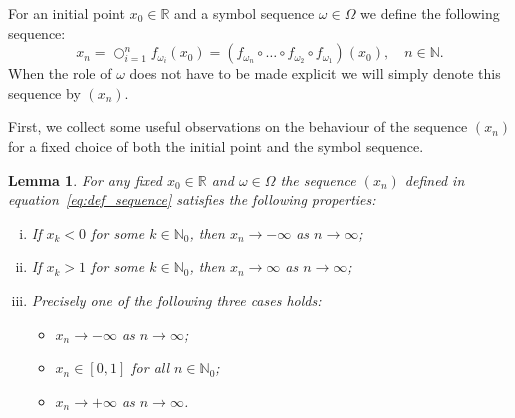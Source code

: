 \documentclass[a4paper,12pt]{article}
\newtheorem{lemma}{Lemma}[section]
\DeclareMathOperator{\bigcomp}{\bigcirc}
\begin{document}
For an initial point $x_0 \in \mathbb{R}$ and a symbol sequence $\omega \in \Omega$ we define the following sequence:
\begin{equation}
\label{eq:def_sequence}
x_n = \bigcomp_{i=1}^n f_{\omega_i}(x_0) = (f_{\omega_n} \circ \dots \circ f_{\omega_2} \circ f_{\omega_1})(x_0), \quad n \in \mathbb{N}.
\end{equation}
When the role of $\omega$ does not have to be made explicit we will simply denote this sequence by $(x_n)$.

First, we collect some useful observations on the behaviour of the sequence $(x_n)$ for a fixed choice of both the initial point and the symbol sequence.

\begin{lemma}
\label{lemma:properties1}
For any fixed $x_0 \in \mathbb{R}$ and $\omega \in \Omega$ the sequence $(x_n)$ defined in equation~\eqref{eq:def_sequence} satisfies the following properties:
\begin{enumerate}[(i)]
\item If $x_k < 0$ for some $k \in \mathbb{N}_0$, then $x_n \to -\infty$ as $n \to \infty$;
\item If $x_k > 1$ for some $k \in \mathbb{N}_0$, then $x_n \to \infty$ as $n \to \infty$;
\item Precisely one of the following three cases holds:
\begin{itemize}
\item $x_n \to -\infty$ as $n \to \infty$;
\item $x_n \in [0,1]$ for all $n \in \mathbb{N}_0$;
\item $x_n \to +\infty$ as $n \to \infty$.
\end{itemize}
\end{enumerate}
\end{lemma}
\end{document}
